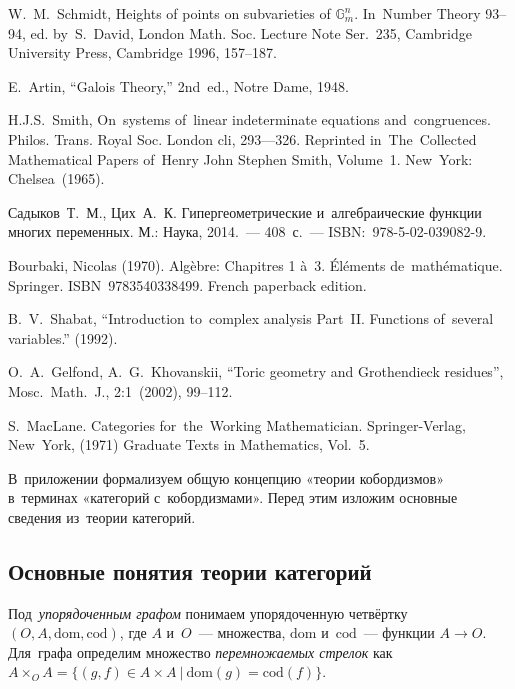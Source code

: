 \documentclass{article}
\begin{document}
\begin{thebibliography}{9}

 W.~M.~Schmidt, Heights of points on subvarieties of $\mathbb{G}^n_m$.
In~Number Theory 93–94, ed. by~S.~David, London Math. Soc. Lecture Note Ser.~235,
Cambridge University Press, Cambridge 1996, 157–187.

 E.~Artin, “Galois Theory,” 2nd~ed., Notre Dame, 1948.

 H.J.S.~Smith, On~systems of~linear indeterminate equations and~congruences. Philos. Trans. Royal
Soc. London cli, 293—326. Reprinted in~The~Collected Mathematical Papers of~Henry John Stephen Smith,
Volume~1. New~York: Chelsea~(1965).

 Садыков~Т.~М., Цих~А.~К. Гипергеометрические и~алгебраические функции многих переменных.
М.: Наука, 2014.~— 408 с.~— ISBN: 978-5-02-039082-9.

 Bourbaki, Nicolas (1970). Algèbre: Chapitres 1 à~3. Éléments de~mathématique. Springer. ISBN~9783540338499. French paperback edition.

 B.~V.~Shabat, “Introduction to~complex analysis Part~II. Functions of~several variables.” (1992).

 O.~A.~Gelfond, A.~G.~Khovanskii, “Toric geometry and Grothendieck residues”, Mosc.~Math.~J., 2:1~(2002), 99–112.

 S.~MacLane. Categories for~the~Working Mathematician. Springer-Verlag, New~York, (1971) Graduate Texts in Mathematics, Vol.~5.

\end{thebibliography}
\pagebreak

\renewcommand{\thesection}{\Alph{section}}
\setcounter{section}{1}
\setcounter{subsection}{0}


В~приложении формализуем общую концепцию «теории кобордизмов» в~терминах «категорий с~кобордизмами».
Перед этим изложим основные сведения из~теории категорий.

\subsection{Основные понятия теории категорий}

Под~\textit{упорядоченным графом} \cite{MacLane71} понимаем упорядоченную четвёртку $(O, A, \mathrm{dom}, \mathrm{cod})$,
где $A$ и~$O$~— множества, $\mathrm{dom}$ и~$\mathrm{cod}$~— функции $A \rightarrow O$.
Для~графа определим множество \textit{перемножаемых стрелок} как $A \times_O A = \{ (g, f) \in A \times A \ |\ \mathrm{dom}(g) = \mathrm{cod}(f) \}$.
\end{document}
